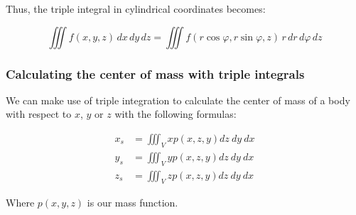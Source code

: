 Thus, the triple integral in cylindrical coordinates becomes:

\[
    \iiint f(x, y, z)\, dx\, dy\, dz = \iiint f(r \cos \varphi, r \sin \varphi, z)\, r\, dr\, d\varphi\, 
    dz
\]

\subsubsection{Calculating the center of mass with triple integrals}

We can make use of triple integration to calculate the center of mass of a body with
respect to \(x\), \(y\) or \(z\) with the following formulas:

\begin{align*}
    x_s &= \iiint_V xp(x,z,y)dz\ dy \ dx\\
    y_s &= \iiint_V yp(x,z,y)dz\ dy \ dx\\
    z_s &= \iiint_V zp(x,z,y)dz\ dy \ dx
\end{align*}

Where \(p(x,y,z)\) is our mass function.
